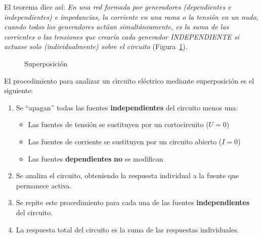 \documentclass[11pt]{book} %
\begin{document}
    El teorema dice así: \textit{En una red formada por generadores (dependientes e independientes) e impedancias, la corriente en una rama o la tensión en un  nudo, cuando todos los generadores actúan simultáneamente, es la suma de las corrientes o las tensiones que crearía cada generador INDEPENDIENTE si actuase solo (individualmente) sobre el circuito} (Figura~\ref{fig.superposicion_cc}).
    \begin{figure}[htbp]
        \centering
        \hfil
        \caption{Superposición}
        \label{fig.superposicion_cc}
    \end{figure}
    
El procedimiento para analizar un circuito eléctrico mediante superposición es el siguiente: 
\begin{enumerate}
\item Se ``apagan'' todas las fuentes \textbf{independientes} del circuito menos una:
    \begin{itemize}
    \item Las fuentes de tensión se sustituyen por un cortocircuito ($U = 0$)
    \item Las fuentes de corriente se sustituyen por un circuito abierto ($I = 0$)
    \item Las fuentes \textbf{dependientes} \textbf{no} se modifican
    \end{itemize}
\item Se analiza el circuito, obteniendo la respuesta individual a la fuente que permanece activa.
\item Se repite este procedimiento para cada una de las fuentes \textbf{independientes} del circuito.
\item La respuesta total del circuito es la suma de las respuestas individuales.
\end{enumerate}
\end{document}
